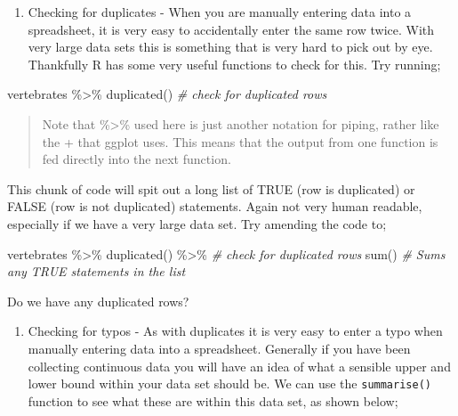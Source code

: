 \documentclass[
]{book}
\newenvironment{Shaded}{\begin{snugshade}}{\end{snugshade}}
\newcommand{\CommentTok}[1]{\textcolor[rgb]{0.56,0.35,0.01}{\textit{#1}}}
\newcommand{\FunctionTok}[1]{\textcolor[rgb]{0.00,0.00,0.00}{#1}}
\newcommand{\NormalTok}[1]{#1}
\newcommand{\SpecialCharTok}[1]{\textcolor[rgb]{0.00,0.00,0.00}{#1}}
\providecommand{\tightlist}{%
  \setlength{\itemsep}{0pt}\setlength{\parskip}{0pt}}
\begin{document}
\begin{enumerate}
\def\labelenumi{\arabic{enumi})}
\tightlist
\item
  Checking for duplicates - When you are manually entering data into a spreadsheet, it is very easy to accidentally enter the same row twice. With very large data sets this is something that is very hard to pick out by eye. Thankfully R has some very useful functions to check for this. Try running;
\end{enumerate}

\begin{Shaded}
\begin{Highlighting}[]
\NormalTok{vertebrates }\SpecialCharTok{\%\textgreater{}\%}
  \FunctionTok{duplicated}\NormalTok{() }\CommentTok{\# check for duplicated rows}
\end{Highlighting}
\end{Shaded}

\begin{quote}
Note that \%\textgreater\% used here is just another notation for piping, rather like the + that ggplot uses. This means that the output from one function is fed directly into the next function.
\end{quote}

This chunk of code will spit out a long list of TRUE (row is duplicated) or FALSE (row is not duplicated) statements. Again not very human readable, especially if we have a very large data set. Try amending the code to;

\begin{Shaded}
\begin{Highlighting}[]
\NormalTok{vertebrates }\SpecialCharTok{\%\textgreater{}\%}
  \FunctionTok{duplicated}\NormalTok{() }\SpecialCharTok{\%\textgreater{}\%} \CommentTok{\# check for duplicated rows}
  \FunctionTok{sum}\NormalTok{() }\CommentTok{\# Sums any TRUE statements in the list }
\end{Highlighting}
\end{Shaded}

Do we have any duplicated rows?

\begin{enumerate}
\def\labelenumi{\arabic{enumi})}
\setcounter{enumi}{1}
\tightlist
\item
  Checking for typos - As with duplicates it is very easy to enter a typo when manually entering data into a spreadsheet. Generally if you have been collecting continuous data you will have an idea of what a sensible upper and lower bound within your data set should be. We can use the \texttt{summarise()} function to see what these are within this data set, as shown below;
\end{enumerate}
\end{document}
